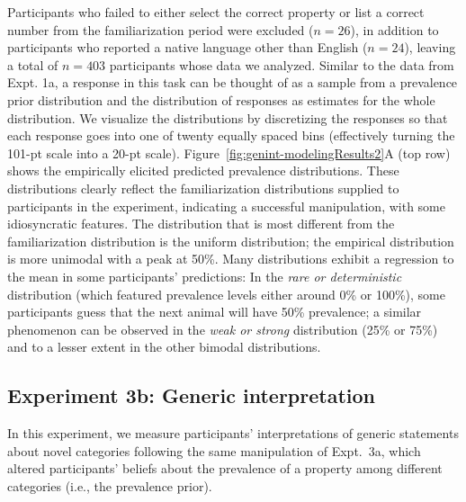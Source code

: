 \documentclass[floatsintext,doc]{apa6}
\newcommand{\ndg}[1]{{\textcolor{Green}{[ndg: #1]}}}
\begin{document}
Participants who failed to either select the correct property or list a correct number from the familiarization period were excluded ($n=26$), in addition to participants who reported a native language other than English ($n=24$), leaving a total of $n=403$ participants whose data we analyzed.
Similar to the data from Expt. 1a, a response in this task can be thought of as a sample from a prevalence prior distribution and the distribution of responses as estimates for the whole distribution.
We visualize the distributions by discretizing the responses so that each response goes into one of twenty equally spaced bins (effectively turning the 101-pt scale into a 20-pt scale).
Figure~\ref{fig:genint-modelingResults2}A (top row) shows the empirically elicited predicted prevalence distributions.
These distributions clearly reflect the familiarization distributions supplied to participants in the experiment, indicating a successful manipulation, with some idiosyncratic features.
The distribution that is most different from the familiarization distribution is the uniform distribution; the empirical distribution is more unimodal with a peak at 50\%.
Many distributions exhibit a regression to the mean in some participants' predictions: In the \emph{rare or deterministic} distribution (which featured prevalence levels either around 0\% or 100\%), some participants guess that the next animal will have 50\% prevalence; a similar phenomenon can be observed in the \emph{weak or strong} distribution (25\% or 75\%) and to a lesser extent in the other bimodal distributions.



\hypertarget{experiment-2b-generic-interpretation}{%
\subsection{Experiment 3b: Generic interpretation}\label{experiment-2b-generic-interpretation}}
In this experiment, we measure participants' interpretations of generic statements about novel categories following the same manipulation of Expt.~3a, which altered participants' beliefs about the prevalence of a property among different categories (i.e., the prevalence prior). 
\end{document}
